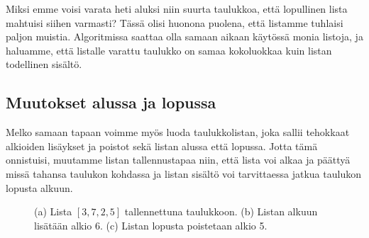 Miksi emme voisi varata heti aluksi niin suurta taulukkoa,
että lopullinen lista mahtuisi siihen varmasti?
Tässä olisi huonona puolena, että listamme tuhlaisi paljon muistia.
Algoritmissa saattaa olla samaan aikaan käytössä monia listoja,
ja haluamme, että listalle varattu taulukko on samaa kokoluokkaa
kuin listan todellinen sisältö.

\subsection{Muutokset alussa ja lopussa}

Melko samaan tapaan voimme myös luoda taulukkolistan,
joka sallii tehokkaat alkioiden lisäykset ja poistot
sekä listan alussa että lopussa.
Jotta tämä onnistuisi, muutamme listan tallennustapaa niin,
että lista voi alkaa ja päättyä missä tahansa taulukon
kohdassa ja listan sisältö voi tarvittaessa jatkua taulukon lopusta alkuun.

\begin{figure}
\center
{}
\caption{(a) Lista $[3,7,2,5]$ tallennettuna taulukkoon.
(b) Listan alkuun lisätään alkio 6.
(c) Listan lopusta poistetaan alkio 5.}
\label{fig:lismol}
\end{figure}

